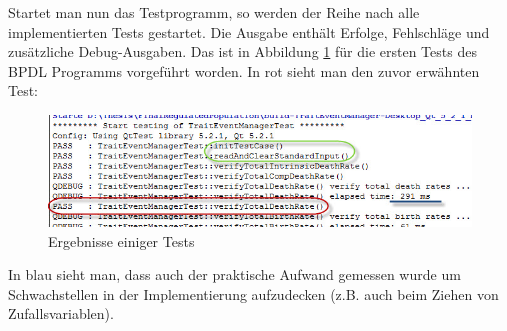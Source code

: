 \documentclass[11pt, a4paper, german]{article}
\theoremstyle{plain}
\begin{document}
	Startet man nun das Testprogramm, so werden der Reihe nach alle implementierten Tests gestartet. Die Ausgabe enthält Erfolge, Fehlschläge und zusätzliche Debug-Ausgaben. Das ist in Abbildung \ref{Test Results} für die ersten Tests des BPDL Programms vorgeführt worden. In rot sieht man den zuvor erwähnten Test:
	\begin{figure}[H]
		\centering
		\includegraphics[width=1 \linewidth]{./Pictures/TestResult_start_death}
		\caption[Test Resultat einer Test Datei]{Ergebnisse einiger Tests}
		\label{Test Results}
	\end{figure}
	In blau sieht man, dass auch der praktische Aufwand gemessen wurde um Schwachstellen in der Implementierung aufzudecken (z.B. auch beim Ziehen von Zufallsvariablen).\\
	
\end{document}
